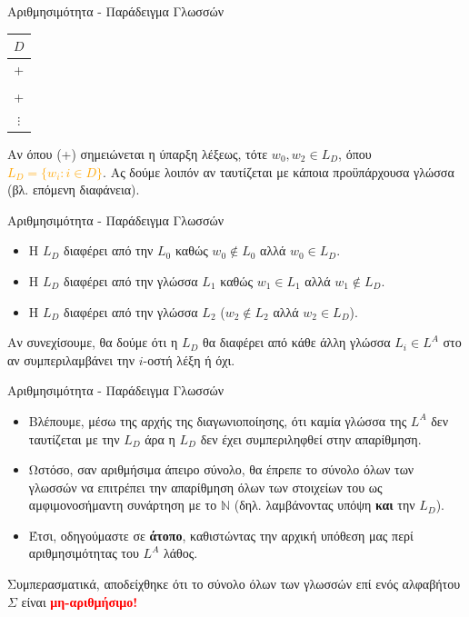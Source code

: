 \documentclass[size=14pt, paper=smartboard, style=fyma, mode=present]{powerdot}
\begin{document}
\begin{slide}[toc=]{Αριθμησιμότητα - Παράδειγμα Γλωσσών}
{\LARGE \begin{center}
	\begin{tabular}{|c|}
		\multicolumn{1}{c}{$D$} \\ \hline
		+ \\ \hline
		\\ \hline
		+ \\ \hline
		\multicolumn{1}{c}{$\vdots$}
	\end{tabular}
\end{center} \pause 
Αν όπου (+) σημειώνεται η ύπαρξη λέξεως, τότε $w_0, w_2 \in L_D$, όπου \textcolor{orange}{$L_D = \{w_i : i \in D\}$}.
Ας δούμε λοιπόν αν ταυτίζεται με κάποια προϋπάρχουσα γλώσσα (βλ. επόμενη διαφάνεια).
}
\end{slide}

\begin{slide}[toc=]{Αριθμησιμότητα - Παράδειγμα Γλωσσών}
	{\LARGE \begin{itemize}
			\item Η $L_D$ διαφέρει από την $L_0$ καθώς $w_0 \notin L_0$ αλλά $w_0 \in L_D$. \pause
			\item Η $L_D$ διαφέρει από την γλώσσα $L_1$ καθώς $w_1 \in L_1$ αλλά $w_1 \notin L_D$. \pause
			\item Η $L_D$ διαφέρει από την γλώσσα $L_2$ ($w_2 \notin L_2$ αλλά $w_2 \in L_D$).
	\end{itemize} \pause
	Αν συνεχίσουμε, θα δούμε ότι η $L_D$ θα διαφέρει από κάθε άλλη γλώσσα $L_i \in L^A$ στο αν συμπεριλαμβάνει την $i$-οστή λέξη ή όχι.	}
\end{slide}

\begin{slide}[toc=]{Αριθμησιμότητα - Παράδειγμα Γλωσσών}
	{\large \begin{itemize}
			\item Βλέπουμε, μέσω της αρχής της διαγωνιοποίησης, ότι καμία γλώσσα της $L^A$ δεν ταυτίζεται με την $L_D$ άρα η $L_D$ δεν έχει συμπεριληφθεί στην απαρίθμηση. \pause
			\item Ωστόσο, σαν αριθμήσιμα άπειρο σύνολο, θα έπρεπε το σύνολο όλων των γλωσσών να επιτρέπει την απαρίθμηση όλων των στοιχείων του ως αμφιμονοσήμαντη συνάρτηση με το $\mathbb{N}$ (δηλ. λαμβάνοντας υπόψη \textbf{και} την $L_D$). \pause
			\item Έτσι, οδηγούμαστε σε \textbf{άτοπο}, καθιστώντας την αρχική υπόθεση μας περί αριθμησιμότητας του $L^A$ λάθος.
		\end{itemize} \pause
	Συμπερασματικά, αποδείχθηκε ότι το σύνολο όλων των γλωσσών επί ενός αλφαβήτου $\Sigma$ είναι \textcolor{red}{\textbf{μη-αριθμήσιμο!}}	}
\end{slide}
\end{document}
